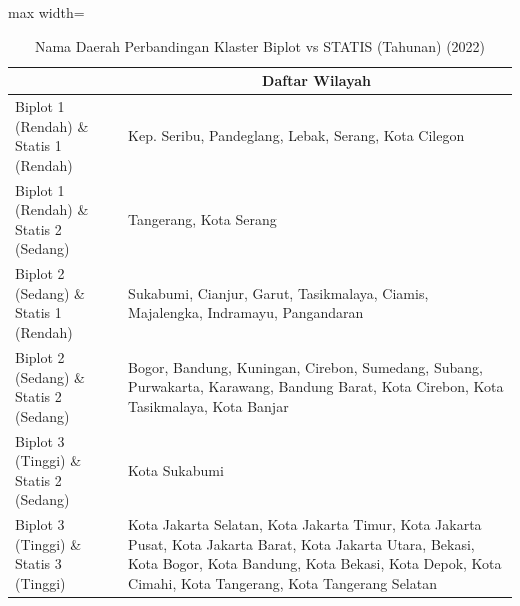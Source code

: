 \begin{table}[H]
\centering
\caption{Nama Daerah Perbandingan Klaster Biplot vs STATIS (Tahunan) (2022)} \label{tab:app2biplot_statis_comp_name_2022}
\begin{adjustbox}{max width=\textwidth}
\begin{tabular}{|>{\centering\arraybackslash}p{4cm}|p{10cm}|}
\hline
\multicolumn{1}{|c|}{\textbf{Kategori}} & \multicolumn{1}{c|}{\textbf{Daftar Wilayah}} \\
\hline
Biplot 1 (Rendah) \& Statis 1 (Rendah) & Kep. Seribu, Pandeglang, Lebak, Serang, Kota Cilegon \\
\hline
Biplot 1 (Rendah) \& Statis 2 (Sedang) & Tangerang, Kota Serang \\
\hline
Biplot 2 (Sedang) \& Statis 1 (Rendah) & Sukabumi, Cianjur, Garut, Tasikmalaya, Ciamis, Majalengka, Indramayu, Pangandaran \\
\hline
Biplot 2 (Sedang) \& Statis 2 (Sedang) & Bogor, Bandung, Kuningan, Cirebon, Sumedang, Subang, Purwakarta, Karawang, Bandung Barat, Kota Cirebon, Kota Tasikmalaya, Kota Banjar \\
\hline
Biplot 3 (Tinggi) \& Statis 2 (Sedang) & Kota Sukabumi \\
\hline
Biplot 3 (Tinggi) \& Statis 3 (Tinggi) & Kota Jakarta Selatan, Kota Jakarta Timur, Kota Jakarta Pusat, Kota Jakarta Barat, Kota Jakarta Utara, Bekasi, Kota Bogor, Kota Bandung, Kota Bekasi, Kota Depok, Kota Cimahi, Kota Tangerang, Kota Tangerang Selatan \\
\hline
\end{tabular}
\end{adjustbox}
\end{table}
